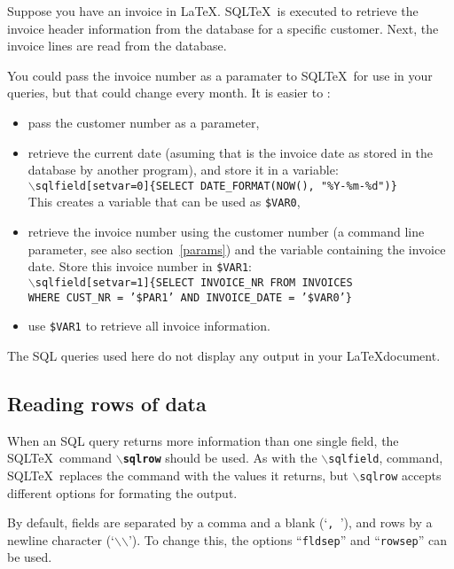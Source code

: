 \documentclass{article}
\newcommand{\bs}{\begin{math}\backslash\end{math}}
\newcommand{\vs}{\vspace{3mm}}
\begin{document}
\vs

Suppose you have an invoice in \LaTeX. SQL\TeX\ is executed to retrieve the invoice header information
from the database for a specific customer. Next, the invoice lines are read from the database.

You could pass the invoice number as a paramater to SQL\TeX\ for use in your queries, but that could
change every month. It is easier to :\\
\begin{itemize}
\item pass the customer number as a parameter,
\item retrieve the current date (asuming that is the invoice date as stored in
the database by another program), and store it in a variable: \\
\texttt{\bs sqlfield[setvar=0]\{SELECT DATE\_FORMAT(NOW(), "\%Y-\%m-\%d")\}} \\
This creates a variable that can be used as \texttt{\$VAR0},
\item retrieve the invoice number using the customer number (a command line parameter,
see also section~\ref{params}) and the variable containing the invoice date.
Store this invoice number in \texttt{\$VAR1}: \\
\texttt{\bs sqlfield[setvar=1]\{SELECT INVOICE\_NR FROM INVOICES \\
WHERE CUST\_NR = '\$PAR1' AND INVOICE\_DATE = '\$VAR0'\}}
\item use \texttt{\$VAR1} to retrieve all invoice information.
\end{itemize}

\vs

The SQL queries used here do not display any output in your \LaTeX document.


\subsection{Reading rows of data}\label{sqlrow}

When an SQL query returns more information than one single field, the SQL\TeX\
command \texttt{\textbf{\bs sqlrow}} should be used. As with the \texttt{\bs sqlfield},
command, SQL\TeX\ replaces the command with the values it returns, but \texttt{\bs sqlrow}
accepts different options for formating the output.

\vs

By default, fields are separated by a comma and a blank (`\texttt{,~}'), and rows by 
a newline character (`\texttt{\bs\bs}'). To change this, the options ``\texttt{fldsep}''
and ``\texttt{rowsep}'' can be used.
\end{document}

